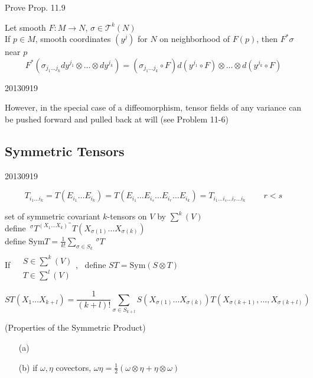  Prove Prop. 11.9

\begin{corollary}[11.10] Let smooth $F:M \to N$, $\sigma \in \mathcal{T}^k(N)$ \\
If $p\in M$, smooth coordinates $(y^j)$ for $N$ on neighborhood of $F(p)$, then $F^*\sigma$ near $p$ 
\[
F^*(\sigma_{j_1 \dots j_k} dy^{j_1} \otimes \dots \otimes dy^{j_k} ) = (\sigma_{j_1 \dots j_k } \circ F ) d(y^{j_1 } \circ F) \otimes \dots \otimes d(y^{j_k} \circ F)
\]
\end{corollary}


20130919

However, in the special case of a diffeomorphism, tensor fields of any variance can be pushed forward and pulled back at will (see Problem 11-6)

\subsection*{Symmetric Tensors}

20130919


\[
T_{i_1 \dots i_k} = T(E_{i_1} \dots E_{i_k} ) = T(E_{i_1} \dots E_{i_s} \dots E_{i_r} \dots E_{i_k} ) = T_{i_1 \dots i_s \dots i_r \dots i_k } \quad \quad \, r<s
\]

\staveXXIX

set of symmetric covariant $k$-tensors on $V$ by $\sum^k(V)$ \\

define $\,^{\sigma}T^(X_1 \dots X_k)^ = T(X_{\sigma(1)} \dots X_{ \sigma(k)})$ \\

define $\text{Sym}T = \frac{1}{k!}  \sum_{\sigma \in S_k} \,^{\sigma}T$ \\

If $\begin{aligned} & \quad \\ 
  & S \in \sum^k(V) \\ 
  & T\in \sum^l(V) \end{aligned}$, \, define $ST = \text{Sym}{ (S\otimes T)}$

\[
ST(X_1 \dots X_{k+l}) = \frac{1}{ (k+l)!} \sum_{ \sigma \in S_{k+l} } S(X_{\sigma(1)} \dots X_{\sigma(k)} ) T(X_{\sigma(k+1)}, \dots , X_{\sigma(k+l) } )
\]

\begin{proposition}[12.15] (Properties of the Symmetric Product)
\begin{enumerate}
\item[(a)]
\item[(b)] if $\omega, \eta$ covectors, $ \omega \eta = \frac{1}{2} ( \omega \otimes \eta + \eta \otimes \omega)$
\end{enumerate}
\end{proposition}

